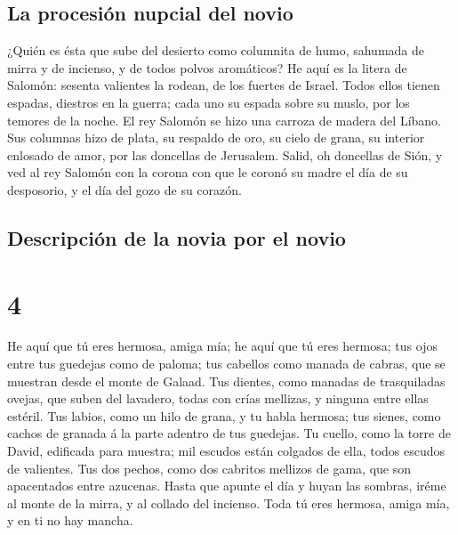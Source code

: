 \hypertarget{la-procesiuxf3n-nupcial-del-novio}{%
\subsection{La procesión nupcial del
novio}\label{la-procesiuxf3n-nupcial-del-novio}}

 ¿Quién es ésta que sube del desierto como columnita de
humo, sahumada de mirra y de incienso, y de todos polvos aromáticos?
 He aquí es la litera de Salomón: sesenta valientes la
rodean, de los fuertes de Israel.  Todos ellos tienen
espadas, diestros en la guerra; cada uno su espada sobre su muslo, por
los temores de la noche.  El rey Salomón se hizo una
carroza de madera del Líbano.  Sus columnas hizo de
plata, su respaldo de oro, su cielo de grana, su interior enlosado de
amor, por las doncellas de Jerusalem.  Salid, oh
doncellas de Sión, y ved al rey Salomón con la corona con que le coronó
su madre el día de su desposorio, y el día del gozo de su corazón.

\hypertarget{descripciuxf3n-de-la-novia-por-el-novio}{%
\subsection{Descripción de la novia por el
novio}\label{descripciuxf3n-de-la-novia-por-el-novio}}

\hypertarget{section-22-4}{%
\section{4}\label{section-22-4}}

 He aquí que tú eres hermosa, amiga mía; he aquí que tú
eres hermosa; tus ojos entre tus guedejas como de paloma; tus cabellos
como manada de cabras, que se muestran desde el monte de Galaad.
 Tus dientes, como manadas de trasquiladas ovejas, que
suben del lavadero, todas con crías mellizas, y ninguna entre ellas
estéril.  Tus labios, como un hilo de grana, y tu habla
hermosa; tus sienes, como cachos de granada á la parte adentro de tus
guedejas.  Tu cuello, como la torre de David, edificada
para muestra; mil escudos están colgados de ella, todos escudos de
valientes.  Tus dos pechos, como dos cabritos mellizos de
gama, que son apacentados entre azucenas.  Hasta que
apunte el día y huyan las sombras, iréme al monte de la mirra, y al
collado del incienso.  Toda tú eres hermosa, amiga mía, y
en ti no hay mancha.

